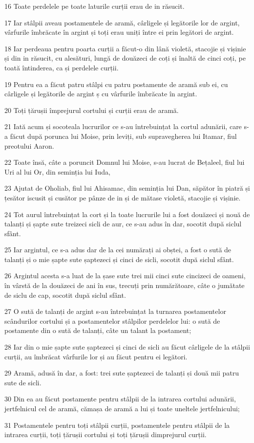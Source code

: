 \par 16 Toate perdelele pe toate laturile curții erau de in răsucit.
\par 17 Iar stâlpii aveau postamentele de aramă, cârligele și legătorile lor de argint, vârfurile îmbrăcate în argint și toți erau uniți între ei prin legători de argint.
\par 18 Iar perdeaua pentru poarta curții a făcut-o din lână violetă, stacojie și vișinie și din in răsucit, cu alesături, lungă de douăzeci de coți și înaltă de cinci coți, pe toată întinderea, ca și perdelele curții.
\par 19 Pentru ea a făcut patru stâlpi cu patru postamente de aramă sub ei, cu cârligele și legătorile de argint ș cu vârfurile îmbrăcate în argint.
\par 20 Toți țărușii împrejurul cortului și curții erau de aramă.
\par 21 Iată acum și socoteala lucrurilor ce s-au întrebuințat la cortul adunării, care s-a făcut după porunca lui Moise, prin leviți, sub supravegherea lui Itamar, fiul preotului Aaron.
\par 22 Toate însă, câte a poruncit Domnul lui Moise, s-au lucrat de Bețaleel, fiul lui Uri al lui Or, din seminția lui Iuda,
\par 23 Ajutat de Oholiab, fiul lui Ahisamac, din seminția lui Dan, săpător în piatră și țesător iscusit și cusător pe pânze de in și de mătase violetă, stacojie și vișinie.
\par 24 Tot aurul întrebuințat la cort și la toate lucrurile lui a fost douăzeci și nouă de talanți și șapte sute treizeci sicli de aur, ce s-au adus în dar, socotit după siclul sfânt.
\par 25 Iar argintul, ce s-a adus dar de la cei numărați ai obștei, a fost o sută de talanți și o mie șapte sute șaptezeci și cinci de sicli, socotit după siclul sfânt.
\par 26 Argintul acesta s-a luat de la șase sute trei mii cinci sute cincizeci de oameni, în vârstă de la douăzeci de ani în sus, trecuți prin numărătoare, câte o jumătate de siclu de cap, socotit după siclul sfânt.
\par 27 O sută de talanți de argint s-au întrebuințat la turnarea postamentelor scândurilor cortului și a postamentelor stâlpilor perdelelor lui: o sută de postamente din o sută de talanți, câte un talant la postament;
\par 28 Iar din o mie șapte sute șaptezeci și cinci de sicli au făcut cârligele de la stâlpii curții, au îmbrăcat vârfurile lor și au făcut pentru ei legători.
\par 29 Aramă, adusă în dar, a fost: trei sute șaptezeci de talanți și două mii patru sute de sicli.
\par 30 Din ea au făcut postamente pentru stâlpii de la intrarea cortului adunării, jertfelnicul cel de aramă, cămașa de aramă a lui și toate uneltele jertfelnicului;
\par 31 Postamentele pentru toți stâlpii curții, postamentele pentru stâlpii de la intrarea curții, toți țărușii cortului și toți țărușii dimprejurul curții.

